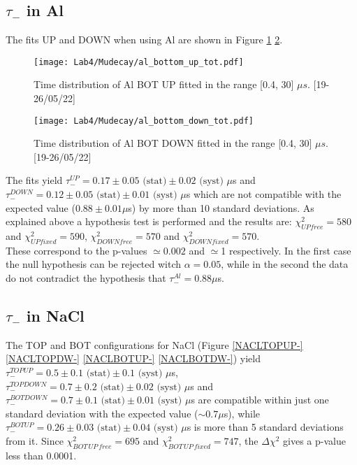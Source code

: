 \documentclass[10pt,a4paper,twocolumn]{article}
\begin{document}
\subsection{$\tau_-$ in Al}
The fits UP and DOWN when using Al are shown in Figure \ref{ALUP-} \ref{ALDW-}. 

\begin{figure}[h!]
\centering
\caption{Time distribution of Al BOT UP fitted in the range [0.4, 30] $\mu s$. [19-26/05/22]}
\texttt{[image: Lab4/Mudecay/al\_bottom\_up\_tot.pdf]} 
\label{ALUP-}
\end{figure}

\begin{figure}[h!]
\centering
\caption{Time distribution of Al BOT DOWN fitted in the range [0.4, 30] $\mu s$. [19-26/05/22]}
\texttt{[image: Lab4/Mudecay/al\_bottom\_down\_tot.pdf]} 
\label{ALDW-}
\end{figure}

The fits yield $\tau_-^{UP}=0.17 \pm 0.05 \text{ (stat)} \pm 0.02 \text{ (syst) }\mu$s and $\tau_-^{DOWN}=0.12 \pm 0.05 \text{ (stat)} \pm 0.01 \text{ (syst) }\mu$s which are not compatible with the expected value ($0.88 \pm 0.01 \mu$s) by more than 10 standard deviations. As explained above a hypothesis test is performed and the results are:
$\chi^2_{UP free}  = 580$ and $\chi^2_{UP fixed}  = 590$, 
$\chi^2_{DOWN free} = 570$ and $\chi^2_{DOWN fixed} = 570$.
\\
These correspond to the p-values $\simeq0.002$ and $\simeq$1 respectively. In the first case the null hypothesis can be rejected witch $\alpha=0.05$, while in the second the data do not contradict the hypothesis that $\tau_-^{Al}=0.88 \mu$s.

\subsection{$\tau_-$ in NaCl}
The TOP and BOT configurations for NaCl (Figure \ref{NACLTOPUP-} \ref{NACLTOPDW-} \ref{NACLBOTUP-} \ref{NACLBOTDW-}) yield $\tau_-^{TOP UP} =  0.5\pm 0.1 \text{ (stat)} \pm 0.1 \text{ (syst) }\mu$s, $\tau_-^{TOP DOWN} = 0.7\pm 0.2 \text{ (stat)} \pm 0.02 \text{ (syst) }\mu$s and $\tau_-^{BOT DOWN} = 0.7\pm 0.1 \text{ (stat)} \pm 0.01 \text{ (syst) }\mu$s are compatible within just one standard deviation with the expected value ($\sim 0.7 \mu$s), while $\tau_-^{BOT UP} =  0.26\pm 0.03 \text{ (stat)} \pm 0.04 \text{ (syst) }\mu$s is more than 5 standard deviations from it. Since 
$\chi^2_{BOT \, UP \, free} = 695$ and $\chi^2_{BOT \, UP \, fixed} = 747$, the $\Delta \chi^2$ gives a p-value less than 0.0001.
\end{document}
